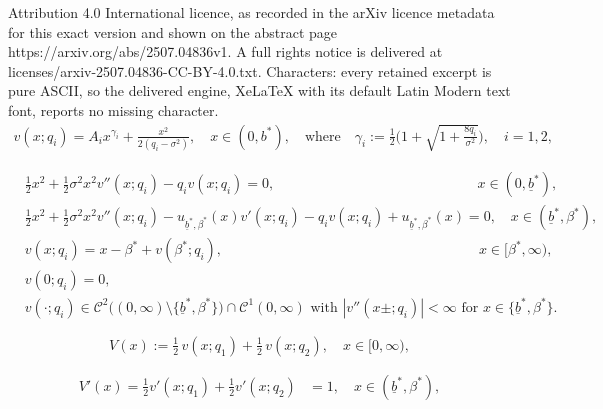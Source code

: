 \documentclass[10pt,a4paper]{amsart}
\def\ub{\underline{b}}
\begin{document}
Attribution 4.0 International licence, as recorded in the arXiv licence metadata for this exact version and shown on the abstract page https://arxiv.org/abs/2507.04836v1. A full rights notice is delivered at licenses/arxiv-2507.04836-CC-BY-4.0.txt. Characters: every retained excerpt is pure ASCII, so the delivered engine, XeLaTeX with its default Latin Modern text font, reports no missing character.
\begin{align}\label{w_pure_def}
v(x;q_i)=A_ix^{\gamma_i}+\frac{x^2}{2(q_i-\sigma^2)}, \quad x\in (0,b^*), 
\quad \text{where} \quad 
\gamma_i:=\frac{1}{2}\bigg(1+\sqrt{1+\frac{8q_i}{\sigma^2}} \bigg),\quad i=1,2,
\end{align}

\begin{align}
&\tfrac12 x^2 + \tfrac12 \sigma^2 x^2 v''(x;q_i) - q_i v(x;q_i) = 0, \qquad \qquad \qquad \qquad \qquad \qquad \qquad \;\, x \in (0,\ub^*), 
\label{XBVPaa}\\
&\tfrac12 x^2 + \tfrac12 \sigma^2 x^2 v''(x;q_i) - u_{\ub^*,\beta^*}(x) v'(x;q_i) - q_i v(x;q_i) + u_{\ub^*,\beta^*}(x) = 0, \quad x \in (\ub^*,\beta^*), 
\label{XBVPaaa}\\
&v(x;q_i) = x - \beta^* + v(\beta^*;q_i), \qquad \qquad \qquad \qquad \qquad \qquad \qquad \qquad \qquad \; x \in [\beta^*,\infty), 
\label{XBVPab}\\
&v(0;q_i) = 0, 
\label{XBVPac}\\
& \text{$v(\cdot;q_i)\in \mathcal{C}^2\big( (0,\infty) \setminus \{\ub^*, \beta^*\} \big) \cap \mathcal{C}^1(0,\infty)$ with $|v''(x\pm;q_i)|<\infty$ for $x\in\{\ub^*,\beta^*\}$}.
\label{XBVPad}
\end{align} 

\begin{equation} \label{J_mild_def}
V(x) := \tfrac12 \, v(x; q_1) + \tfrac12 \, v(x; q_2), \quad x \in [0,\infty),
\end{equation} 

\begin{align} \label{eq_ex_1} 
V'(x) = \tfrac{1}{2} v'(x;q_1) + \tfrac{1}{2} v'(x;q_2) &= 1, \quad x \in (\ub^*, \beta^*), 
\end{align}
\end{document}
